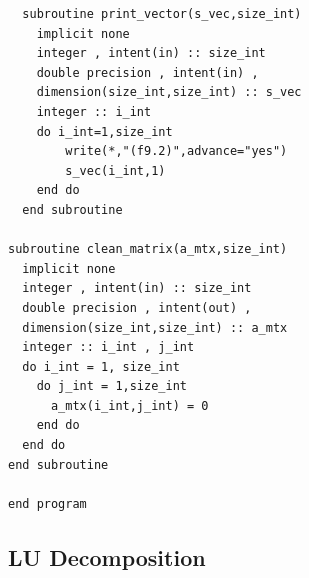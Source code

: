 \documentclass[twocolumn]{article}
\begin{document}
\begin{verbatim}
  subroutine print_vector(s_vec,size_int)
    implicit none
    integer , intent(in) :: size_int
    double precision , intent(in) , 
    dimension(size_int,size_int) :: s_vec
    integer :: i_int
    do i_int=1,size_int
        write(*,"(f9.2)",advance="yes")
        s_vec(i_int,1)
    end do 
  end subroutine

subroutine clean_matrix(a_mtx,size_int)
  implicit none
  integer , intent(in) :: size_int
  double precision , intent(out) , 
  dimension(size_int,size_int) :: a_mtx
  integer :: i_int , j_int
  do i_int = 1, size_int
    do j_int = 1,size_int
      a_mtx(i_int,j_int) = 0
    end do 
  end do
end subroutine

end program
\end{verbatim}

\subsection{LU Decomposition} \label{LU Decomposition2}
\end{document}
